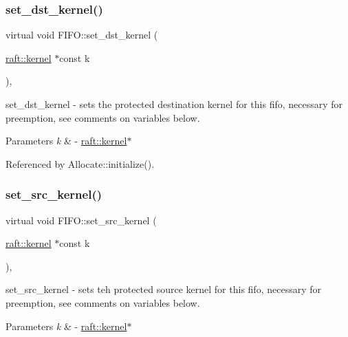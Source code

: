\subsubsection{\texorpdfstring{set\+\_\+dst\+\_\+kernel()}{set\_dst\_kernel()}}
{\footnotesize\ttfamily virtual void F\+I\+F\+O\+::set\+\_\+dst\+\_\+kernel (\begin{DoxyParamCaption}\item[{\hyperlink{classraft_1_1kernel}{raft\+::kernel} $\ast$const}]{k }\end{DoxyParamCaption})\hspace{0.3cm}{\ttfamily [protected]}, {}}

set\+\_\+dst\+\_\+kernel -\/ sets the protected destination kernel for this fifo, necessary for preemption, see comments on variables below. 
\begin{DoxyParams}{Parameters}
{\em k} & -\/ \hyperlink{classraft_1_1kernel}{raft\+::kernel}$\ast$ \\
\hline
\end{DoxyParams}


Referenced by Allocate\+::initialize().

\hypertarget{class_f_i_f_o_aa9c1f679b4e2585047af2c09a2518209}{}\label{class_f_i_f_o_aa9c1f679b4e2585047af2c09a2518209} 
\subsubsection{\texorpdfstring{set\+\_\+src\+\_\+kernel()}{set\_src\_kernel()}}
{\footnotesize\ttfamily virtual void F\+I\+F\+O\+::set\+\_\+src\+\_\+kernel (\begin{DoxyParamCaption}\item[{\hyperlink{classraft_1_1kernel}{raft\+::kernel} $\ast$const}]{k }\end{DoxyParamCaption})\hspace{0.3cm}{\ttfamily [protected]}, {}}

set\+\_\+src\+\_\+kernel -\/ sets teh protected source kernel for this fifo, necessary for preemption, see comments on variables below. 
\begin{DoxyParams}{Parameters}
{\em k} & -\/ \hyperlink{classraft_1_1kernel}{raft\+::kernel}$\ast$ \\
\hline
\end{DoxyParams}


